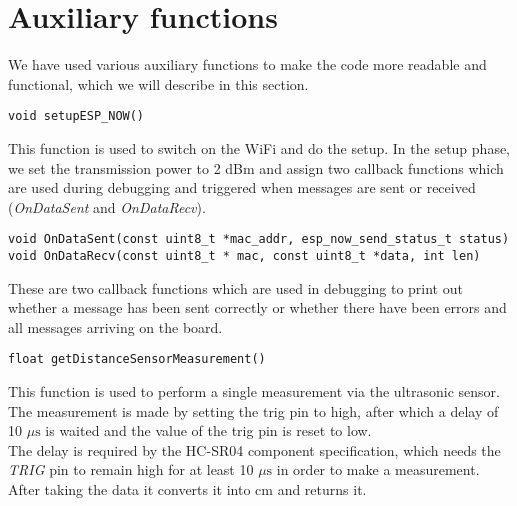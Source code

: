 \section{Auxiliary functions}
We have used various auxiliary functions to make the code more readable and functional, which we will describe in this section.\\
\begin{verbatim}
void setupESP_NOW()
\end{verbatim}
This function is used to switch on the WiFi and do the setup.
In the setup phase, we set the transmission power to 2 dBm and assign two callback functions which are used during debugging and triggered when messages are sent or received (\textit{OnDataSent} and \textit{OnDataRecv}). \\
\begin{verbatim}
void OnDataSent(const uint8_t *mac_addr, esp_now_send_status_t status)
void OnDataRecv(const uint8_t * mac, const uint8_t *data, int len) 
\end{verbatim}
These are two callback functions which are used in debugging to print out whether a message has been sent correctly or whether there have been errors and all messages arriving on the board. \\
\begin{verbatim}
float getDistanceSensorMeasurement()
\end{verbatim}
This function is used to perform a single measurement via the ultrasonic sensor.
The measurement is made by setting the trig pin to high, after which a delay of 10 $\mu\text{s}$ is waited and the value of the trig pin is reset to low. \\
The delay is required by the HC-SR04 component specification, which needs the \textit{TRIG} pin to remain high for at least 10 $\mu\text{s}$ in order to make a measurement. After taking the data it converts it into cm and returns it.

